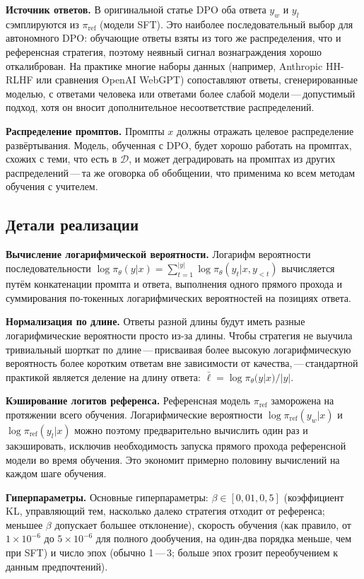 \textbf{Источник ответов.} В оригинальной статье DPO оба ответа $y_w$ и $y_l$ сэмплируются из $\pi_\mathrm{ref}$ (модели SFT). Это наиболее последовательный выбор для автономного DPO: обучающие ответы взяты из того же распределения, что и референсная стратегия, поэтому неявный сигнал вознаграждения хорошо откалиброван. На практике многие наборы данных (например, Anthropic HH-RLHF или сравнения OpenAI WebGPT) сопоставляют ответы, сгенерированные моделью, с ответами человека или ответами более слабой модели\,---\,допустимый подход, хотя он вносит дополнительное несоответствие распределений.

\textbf{Распределение промптов.} Промпты $x$ должны отражать целевое распределение развёртывания. Модель, обученная с DPO, будет хорошо работать на промптах, схожих с теми, что есть в $\mathcal{D}$, и может деградировать на промптах из других распределений\,---\,та же оговорка об обобщении, что применима ко всем методам обучения с учителем.

\subsection{Детали реализации}

\textbf{Вычисление логарифмической вероятности.} Логарифм вероятности последовательности $\log\pi_\theta(y|x) = \sum_{t=1}^{|y|} \log\pi_\theta(y_t | x, y_{<t})$ вычисляется путём конкатенации промпта и ответа, выполнения одного прямого прохода и суммирования по-токенных логарифмических вероятностей на позициях ответа.

\textbf{Нормализация по длине.} Ответы разной длины будут иметь разные логарифмические вероятности просто из-за длины. Чтобы стратегия не выучила тривиальный шорткат по длине\,---\,присваивая более высокую логарифмическую вероятность более коротким ответам вне зависимости от качества,\,---\,стандартной практикой является деление на длину ответа: $\bar\ell = \log\pi_\theta(y|x) / |y|$.

\textbf{Кэширование логитов референса.} Референсная модель $\pi_\mathrm{ref}$ заморожена на протяжении всего обучения. Логарифмические вероятности $\log\pi_\mathrm{ref}(y_w|x)$ и $\log\pi_\mathrm{ref}(y_l|x)$ можно поэтому предварительно вычислить один раз и закэшировать, исключив необходимость запуска прямого прохода референсной модели во время обучения. Это экономит примерно половину вычислений на каждом шаге обучения.

\textbf{Гиперпараметры.} Основные гиперпараметры: $\beta \in [0{,}01, 0{,}5]$ (коэффициент KL, управляющий тем, насколько далеко стратегия отходит от референса; меньшее $\beta$ допускает большее отклонение), скорость обучения (как правило, от $1\times10^{-6}$ до $5\times10^{-6}$ для полного дообучения, на один-два порядка меньше, чем при SFT) и число эпох (обычно 1\,---\,3; больше эпох грозит переобучением к данным предпочтений).

